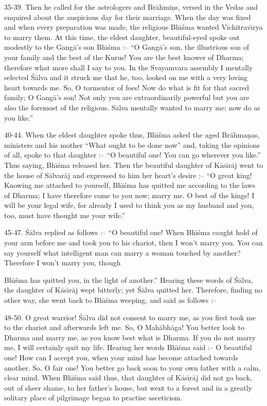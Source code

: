 35-39. Then he called for the astrologers and Br\=ahmi\d{n}s, versed in the Vedas and enquired about the auspicious day for their marriage. When the day was fixed and when every preparation was made, the religious Bh\={\i}\'sma wanted Vichitrav\={\i}rya to marry them. At this time, the eldest daughter, beautiful-eyed spoke out modestly to the Gang\=a's son Bh\={\i}\'sma :-- ``O Gang\=a's son, the illustrious son of your family and the best of the Kurus! You are the best knower of Dharma; therefore what more shall I say to you. In the Svayamvara assembly I mentally selected \'S\=alva and it struck me that he, too, looked on me with a very loving heart towards me. So, O tormentor of foes! Now do what is fit for that sacred family; O Gang\=a's son! Not only you are extraordinarily powerful but you are also the foremost of the religious. S\=alva mentally wanted to marry me; now do as you like.''

40-44. When the eldest daughter spoke thus, Bh\={\i}\'sma asked the aged Br\=ahma\d{n}as, ministers and his mother ``What ought to be done now'' and, taking the opinions of all, spoke to that daughter :-- ``O beautiful one! You can go wherever you like.'' Thus saying, Bh\={\i}\'sma released her. Then the beautiful daughter of K\=as\={\i}r\=aj went to the house of S\=alvar\=aj and expressed to him her heart's desire :-- ``O great king! Knowing me attached to yourself, Bh\={\i}\'sma has quitted me according to the laws of Dharma; I have therefore come to you now; marry me. O best of the kings! I will be your legal wife, for already I used to think you as my husband and you, too, must have thought me your wife.''

45-47. \'S\=alva replied as follows :-- ``O beautiful one! When Bh\={\i}\'sma caught hold of your arm before me and took you to his chariot, then I won't marry you. You can say yourself what intelligent man can marry a woman touched by another? Therefore I won't marry you, though

Bh\={\i}\'sma has quitted you, in the light of another.'' Hearing these words of \'S\=alva, the daughter of K\=as\={\i}r\=aj wept bitterly; yet \'S\=alva quitted her. Therefore, finding no other way, she went back to Bh\={\i}\'sma weeping, and said as follows :--

48-50. O great warrior! \'S\=alva did not consent to marry me, as you first took me to the chariot and afterwards left me. So, O Mah\=abh\=aga! You better look to Dharma and marry me, as you know best what is Dharma. If you do not marry me, I will certainly quit my life. Hearing her words Bh\={\i}\'sma said :-- O beautiful one! How can I accept you, when your mind has become attached towards another. So, O fair one! You better go back soon to your own father with a calm, clear mind. When Bh\={\i}\'sma said thus, that daughter of K\=as\={\i}r\=aj did not go back, out of sheer shame, to her father's house, but went to a forest and in a greatly solitary place of pilgrimage began to practise asceticism.


